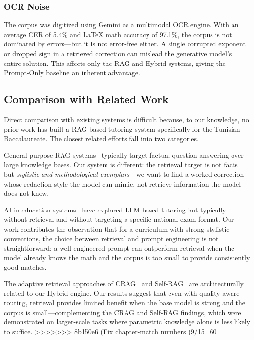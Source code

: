 \subsubsection{OCR Noise}

The corpus was digitized using Gemini as a multimodal OCR engine. With an
average CER of 5.4\% and \LaTeX{} math accuracy of 97.1\%, the corpus is
not dominated by errors—but it is not error-free either. A single
corrupted exponent or dropped sign in a retrieved correction can mislead
the generative model's entire solution. This affects only the RAG and
Hybrid systems, giving the Prompt-Only baseline an inherent advantage.


\subsection{Comparison with Related Work}
\label{subsec:comparison-related-work}

Direct comparison with existing systems is difficult because, to our
knowledge, no prior work has built a RAG-based tutoring system specifically
for the Tunisian Baccalaureate. The closest related efforts fall into two
categories.

General-purpose RAG systems~\cite{gao2024rag_survey} typically target
factual question answering over large knowledge bases. Our system is
different: the retrieval target is not facts but \textit{stylistic and
methodological exemplars}—we want to find a worked correction whose
redaction style the model can mimic, not retrieve information the model does
not know.

AI-in-education systems~\cite{kasneci2023chatgpt_education} have explored
LLM-based tutoring but typically without retrieval and without targeting a
specific national exam format. Our work contributes the observation that for
a curriculum with strong stylistic conventions, the choice between retrieval
and prompt engineering is not straightforward: a well-engineered prompt can
outperform retrieval when the model already knows the math and the corpus is
too small to provide consistently good matches.

The adaptive retrieval approaches of CRAG~\cite{yan2024practical_rag} and
Self-RAG~\cite{asai2023self_rag} are architecturally related to our Hybrid
engine. Our results suggest that even with quality-aware routing, retrieval
provides limited benefit when the base model is strong and the corpus is
small—complementing the CRAG and Self-RAG findings, which were
demonstrated on larger-scale tasks where parametric knowledge alone is less
likely to suffice.
>>>>>>> 8b150e6 (Fix chapter-match numbers (9/15=60%
